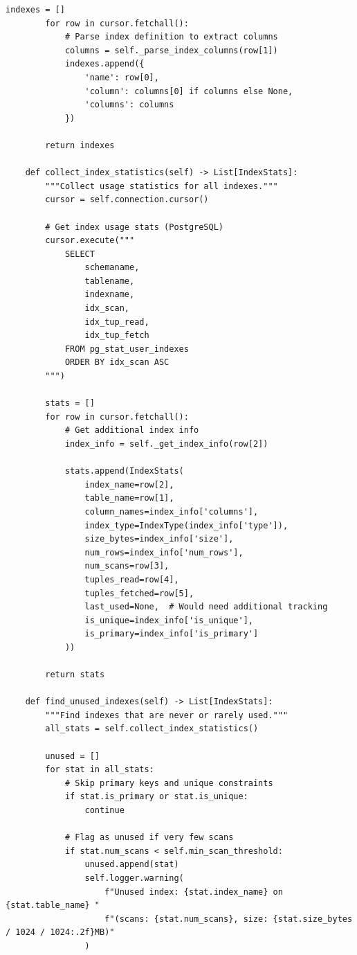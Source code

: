\begin{lstlisting}[style=python, caption=IndexManager with Smart Recommendations]
        indexes = []
        for row in cursor.fetchall():
            # Parse index definition to extract columns
            columns = self._parse_index_columns(row[1])
            indexes.append({
                'name': row[0],
                'column': columns[0] if columns else None,
                'columns': columns
            })

        return indexes

    def collect_index_statistics(self) -> List[IndexStats]:
        """Collect usage statistics for all indexes."""
        cursor = self.connection.cursor()

        # Get index usage stats (PostgreSQL)
        cursor.execute("""
            SELECT
                schemaname,
                tablename,
                indexname,
                idx_scan,
                idx_tup_read,
                idx_tup_fetch
            FROM pg_stat_user_indexes
            ORDER BY idx_scan ASC
        """)

        stats = []
        for row in cursor.fetchall():
            # Get additional index info
            index_info = self._get_index_info(row[2])

            stats.append(IndexStats(
                index_name=row[2],
                table_name=row[1],
                column_names=index_info['columns'],
                index_type=IndexType(index_info['type']),
                size_bytes=index_info['size'],
                num_rows=index_info['num_rows'],
                num_scans=row[3],
                tuples_read=row[4],
                tuples_fetched=row[5],
                last_used=None,  # Would need additional tracking
                is_unique=index_info['is_unique'],
                is_primary=index_info['is_primary']
            ))

        return stats

    def find_unused_indexes(self) -> List[IndexStats]:
        """Find indexes that are never or rarely used."""
        all_stats = self.collect_index_statistics()

        unused = []
        for stat in all_stats:
            # Skip primary keys and unique constraints
            if stat.is_primary or stat.is_unique:
                continue

            # Flag as unused if very few scans
            if stat.num_scans < self.min_scan_threshold:
                unused.append(stat)
                self.logger.warning(
                    f"Unused index: {stat.index_name} on {stat.table_name} "
                    f"(scans: {stat.num_scans}, size: {stat.size_bytes / 1024 / 1024:.2f}MB)"
                )


\end{lstlisting}
